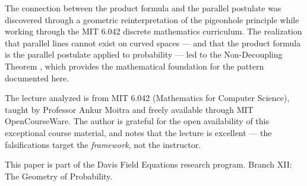 \documentclass[12pt]{article}
\begin{document}
The connection between the product formula and the parallel postulate was discovered through a geometric reinterpretation of the pigeonhole principle while working through the MIT 6.042 discrete mathematics curriculum. The realization that parallel lines cannot exist on curved spaces --- and that the product formula is the parallel postulate applied to probability --- led to the Non-Decoupling Theorem \cite{davis2026nondecoupling}, which provides the mathematical foundation for the pattern documented here.

The lecture analyzed is from MIT 6.042 (Mathematics for Computer Science), taught by Professor Ankur Moitra and freely available through MIT OpenCourseWare. The author is grateful for the open availability of this exceptional course material, and notes that the lecture is excellent --- the falsifications target the \textit{framework}, not the instructor.

This paper is part of the Davis Field Equations research program. Branch XII: The Geometry of Probability.
\end{document}
